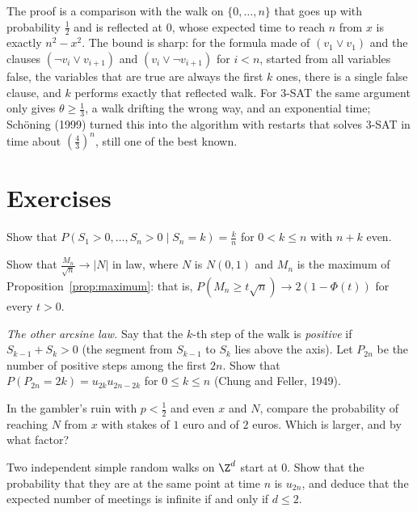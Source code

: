 The proof is a comparison with the walk on $\{0,\dots,n\}$ that goes up with probability $\frac12$ and is reflected at $0$, whose
expected time to reach $n$ from $x$ is exactly $n^2-x^2$. The bound is sharp: for the formula made of $(v_1\vee v_1)$ and the clauses
$(\neg v_i\vee v_{i+1})$ and $(v_i\vee\neg v_{i+1})$ for $i<n$, started from all variables false, the variables that are true are always the first $k$ ones,
there is a single false clause, and $k$ performs exactly that reflected walk. For 3-SAT the same argument only gives $\theta\ge\frac13$, a walk drifting the
wrong way, and an exponential time; Schöning (1999) turned this into the algorithm with restarts that solves 3-SAT
in time about $(\frac43)^n$, still one of the best known.

\section{Exercises}

\begin{exercise}[$\star$]\label{ex:ballotwalk}
Show that $P(S_1>0,\dots,S_n>0\mid S_n=k)=\frac kn$ for $0<k\le n$ with $n+k$ even.
\end{exercise}

\begin{exercise}[$\star\star$]\label{ex:maxlaw}
Show that $\frac{M_n}{\sqrt n}\to|N|$ in law, where $N$ is $N(0,1)$ and $M_n$ is the maximum of Proposition~\ref{prop:maximum}: that is,
$P(M_n\ge t\sqrt n)\to2(1-\Phi(t))$ for every $t>0$.
\end{exercise}

\begin{exercise}[$\star\star\star$]\label{ex:timepositive}
\emph{The other arcsine law.} Say that the $k$-th step of the walk is \emph{positive} if $S_{k-1}+S_k>0$ (the segment from $S_{k-1}$ to $S_k$
lies above the axis). Let $P_{2n}$ be the number of positive steps among the first $2n$. Show that $P(P_{2n}=2k)=u_{2k}u_{2n-2k}$ for
$0\le k\le n$ (Chung and Feller, 1949).
\end{exercise}

\begin{exercise}[$\star$]\label{ex:unfair}
In the gambler's ruin with $p<\frac12$ and even $x$ and $N$, compare the probability of reaching $N$ from $x$ with stakes of
$1$ euro and of $2$ euros. Which is larger, and by what factor?
\end{exercise}

\begin{exercise}[$\star\star$]\label{ex:meet}
Two independent simple random walks on $\Z^d$ start at $0$. Show that the probability that they are at the same
point at time $n$ is $u_{2n}$, and deduce that the expected number of meetings is infinite if and only if $d\le2$.
\end{exercise}

